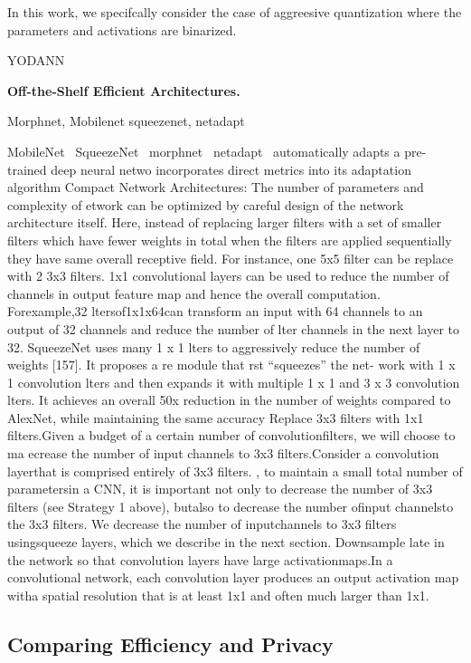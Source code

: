 In this work, we specifcally consider the case of aggreesive quantization where the parameters and activations are binarized.

YODANN

\noindent\textbf{Off-the-Shelf Efficient Architectures.}

Morphnet, Mobilenet squeezenet, netadapt

MobileNet~\cite{conf/cvpr/SandlerHZZC18}
SqueezeNet~\cite{DBLP:journals/corr/IandolaMAHDK16}
morphnet~\cite{46505}
netadapt~\cite{eccv_2018_yang_netadapt} automatically adapts a pre-trained deep neural netwo incorporates direct metrics into its adaptation algorithm
Compact Network Architectures: The number of parameters and complexity of etwork can be optimized by careful design of the network architecture itself.
Here, instead of replacing larger filters with a set of smaller filters which have fewer weights in total when the filters are applied sequentially they have same overall receptive field.
For instance, one 5x5 filter can be replace with 2 3x3 filters. 1x1 convolutional layers can be used to reduce the number of channels in output feature map and hence the overall computation.
Forexample,32 ltersof1x1x64can transform an input with 64 channels to an output of 32 channels and reduce the number of  lter channels in the next layer to 32. SqueezeNet uses many 1 x 1  lters to aggressively reduce the number of weights [157]. It proposes a  re module that  rst “squeezes” the net- work with 1 x 1 convolution  lters and then expands it with multiple 1 x 1 and 3 x 3 convolution  lters.
It achieves an overall 50x reduction in the number of weights compared to AlexNet, while maintaining the same accuracy
Replace 3x3 filters with 1x1 filters.Given a budget of a certain number of convolutionfilters,  we will choose to ma
ecrease the number of input channels to 3x3 filters.Consider a convolution layerthat is comprised entirely of 3x3 filters. , to maintain a small total number of parametersin a CNN, it is important not only to decrease the number of 3x3 filters (see Strategy 1 above), butalso to decrease the number ofinput channelsto the 3x3 filters.  We decrease the number of inputchannels to 3x3 filters usingsqueeze layers, which we describe in the next section.
Downsample late in the network so that convolution layers have large activationmaps.In a convolutional network, each convolution layer produces an output activation map witha spatial resolution that is at least 1x1 and often much larger than 1x1.


\subsection{Comparing Efficiency and Privacy}

